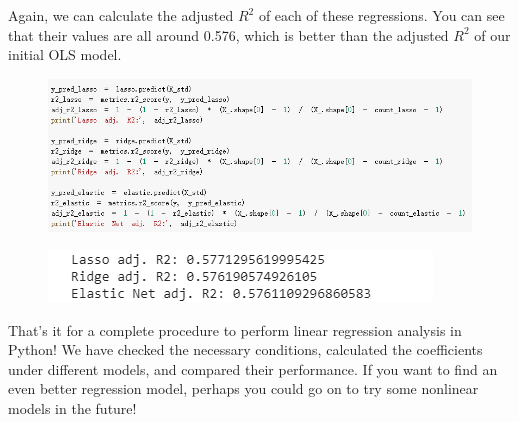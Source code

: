 \documentclass{article}
\begin{document}
Again, we can calculate the adjusted $R^2$ of each of these regressions. You can see that their values are all around 0.576, which is better than the adjusted $R^2$ of our initial OLS model.
\begin{figure}[H]\includegraphics[width=1\linewidth]{48}\end{figure}
\begin{figure}[H]\includegraphics[width=0.6\linewidth]{49}\end{figure}
That's it for a complete procedure to perform linear regression analysis in Python! We have checked the necessary conditions, calculated the coefficients under different models, and compared their performance. If you want to find an even better regression model, perhaps you could go on to try some nonlinear models in the future!
\end{document}
